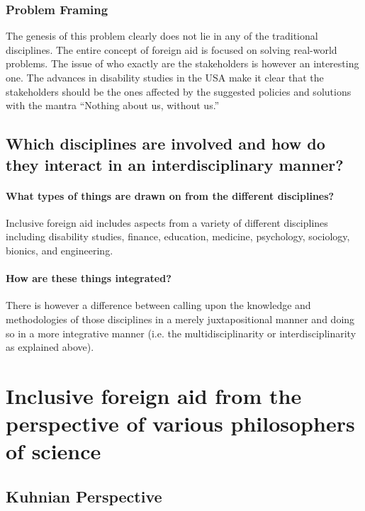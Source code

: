 \documentclass[a4paper]{article}
\begin{document}
\subsubsection{Problem Framing}

The genesis of this problem clearly does not lie in any of the traditional
disciplines. The entire concept of foreign aid is focused on solving
real-world problems. The issue of who exactly are the stakeholders is however
an interesting one. The advances in disability studies in the USA make it
clear that the stakeholders should be the ones affected by the suggested
policies and solutions with the mantra ``Nothing about us, without us.''



\subsection{Which disciplines are involved and how do they interact in an
interdisciplinary manner?}

\paragraph{What types of things are drawn on from the different disciplines?}

Inclusive foreign aid includes aspects from a variety of different disciplines
including disability studies, finance, education, medicine, psychology,
sociology, bionics, and engineering. 

\paragraph{How are these things integrated?}

There is however a difference between calling upon the knowledge and
methodologies of those disciplines in a merely juxtapositional manner and
doing so in a more integrative manner (i.e. the multidisciplinarity or
interdisciplinarity as explained above).

\section{Inclusive foreign aid from the perspective of various philosophers of
science}

\subsection{Kuhnian Perspective}
\end{document}
